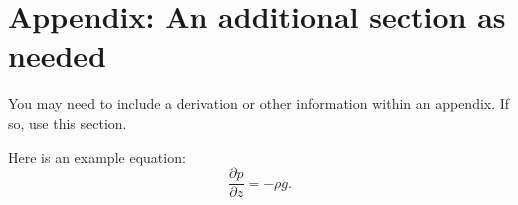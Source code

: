 \documentclass[master]{UWMThesis}
\newcommand{\ptlder}[2]{\frac{\partial #1}{\partial #2}}
\begin{document}









\ThesisAppendix

\setcounter{equation}{0}
\setcounter{table}{0}

\renewcommand{\theequation}{A\arabic{equation}}
\renewcommand{\thetable}{A\arabic{table}}

\chapter*{Appendix: An additional section as needed} \label{sec:appendix}

You may need to include a derivation or other information within an appendix.  If so, use this section.  

Here is an example equation:
\begin{equation}
    \ptlder{p}{z} = - \rho g.
                                                       \label{eq:hydrostatic}
\end{equation}
\end{document}
